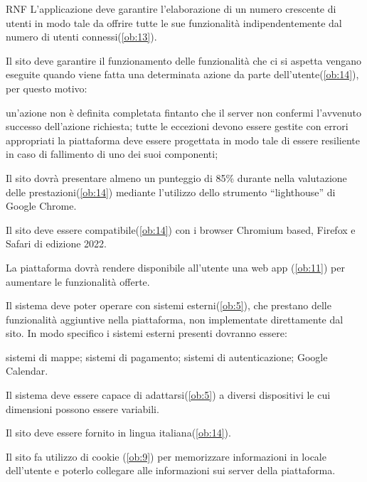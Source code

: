 \begin{listaPersonale}{RNF}
     L'applicazione deve garantire l'elaborazione di un numero crescente di utenti in modo tale da offrire tutte le sue funzionalità indipendentemente dal numero di utenti connessi(\ref{ob:13}).

     Il sito deve garantire il funzionamento delle funzionalità che ci si aspetta vengano eseguite quando viene fatta una determinata azione da parte dell'utente(\ref{ob:14}), per questo motivo:
    \begin{listaPersonale2}{}
         un'azione non è definita completata fintanto che il server non confermi l'avvenuto successo dell'azione richiesta;
         tutte le eccezioni devono essere gestite con errori appropriati
         la piattaforma deve essere progettata in modo tale di essere resiliente in caso di fallimento di uno dei suoi componenti;
    \end{listaPersonale2}

     Il sito dovrà presentare almeno un punteggio di 85\% durante nella valutazione delle prestazioni(\ref{ob:14}) mediante l'utilizzo dello strumento “lighthouse” di Google Chrome.

     Il sito deve essere compatibile(\ref{ob:14}) con i browser Chromium based, Firefox e Safari di edizione 2022.

     La piattaforma dovrà rendere disponibile all'utente una web app (\ref{ob:11}) per aumentare le funzionalità offerte.

     Il sistema deve poter operare con sistemi esterni(\ref{ob:5}), che prestano delle funzionalità aggiuntive nella piattaforma, non implementate direttamente dal sito. In modo specifico i sistemi esterni presenti dovranno essere:
    \begin{listaPersonale2}{}
         sistemi di mappe;
         sistemi di pagamento;
         sistemi di autenticazione;
         Google Calendar.
    \end{listaPersonale2}

     Il sistema deve essere capace di adattarsi(\ref{ob:5}) a diversi dispositivi le cui dimensioni possono essere variabili.

     Il sito deve essere fornito in lingua italiana(\ref{ob:14}).

     Il sito fa utilizzo di cookie (\ref{ob:9}) per memorizzare informazioni in locale dell'utente e poterlo collegare alle informazioni sui server della piattaforma.
\end{listaPersonale}